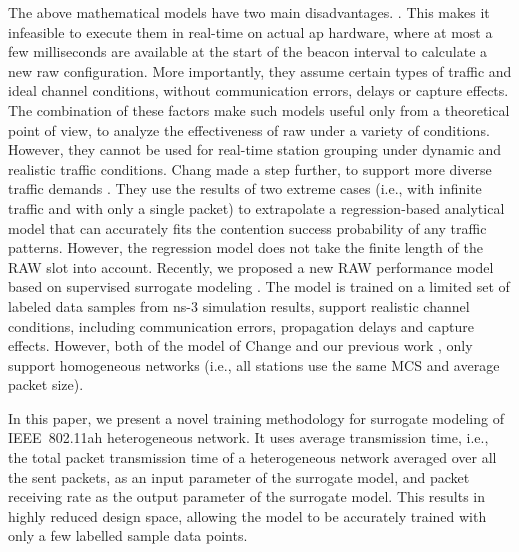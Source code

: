 The above mathematical models have two main disadvantages. . This makes it infeasible to execute them in real-time on actual \gls{ap} hardware, where at most a few milliseconds are available at the start of the beacon interval to calculate a new \gls{raw} configuration. More importantly, they assume certain types of traffic and ideal channel conditions, without communication errors, delays or capture effects. The combination of these factors make such models useful only from a theoretical point of view, to analyze the effectiveness of \gls{raw} under a variety of conditions. However, they cannot be used for real-time station grouping under dynamic and realistic traffic conditions. 
Chang  made a step further, to support more diverse traffic demands \cite{Chang2018}. They use the results of two extreme cases (i.e., with infinite traffic and with only a single packet) to extrapolate a regression-based analytical model that can accurately fits the contention success probability of any traffic patterns. However, the regression model does not take the finite length of the RAW slot into account.
 Recently, we proposed a new RAW performance model based on supervised surrogate modeling \cite{wowmom2018}. The model is trained on a limited set of labeled data samples from ns-3 simulation results, support realistic channel conditions, including communication errors, propagation delays and capture effects. However, both of the model of Change \cite{Chang2018} and our previous work \cite{wowmom2018}, only support homogeneous networks (i.e., all stations use the same MCS and average packet size). 
 
 
 
 In this paper, we present a novel training methodology for surrogate modeling of IEEE~802.11ah heterogeneous network. It uses average transmission time, i.e., the total packet transmission time of a heterogeneous network averaged over all the sent packets, as an input parameter of the surrogate model, and packet receiving rate as the output parameter of the surrogate model. This results in highly reduced design space, allowing the model to be accurately trained with only a few labelled sample data points. 







